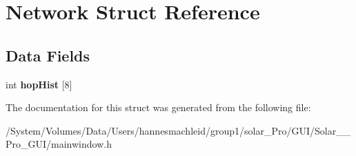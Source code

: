 \hypertarget{struct_network}{}\section{Network Struct Reference}
\label{struct_network}
\subsection*{Data Fields}
\begin{DoxyCompactItemize}
\item 
\mbox{\label{struct_network_ad6e2f3ed5987d75d5ca6c47e5a91dac8}} 
int {\bfseries hop\+Hist} \mbox{[}8\mbox{]}
\end{DoxyCompactItemize}


The documentation for this struct was generated from the following file\+:\begin{DoxyCompactItemize}
\item 
/\+System/\+Volumes/\+Data/\+Users/hannesmachleid/group1/solar\+\_\+\+Pro/\+G\+U\+I/\+Solar\+\_\+\+\_\+\+Pro\+\_\+\+G\+U\+I/mainwindow.\+h\end{DoxyCompactItemize}
